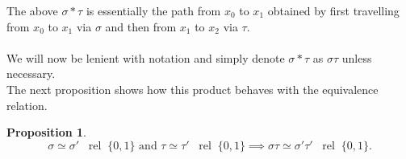 \documentclass[12pt]{article}
\theoremstyle{definition}
\numberwithin{thm}{section}
\newtheorem{prop}[thm]{Proposition}
\newcommand{\rel}{\;\;\operatorname{rel}\;}
\begin{document}
The above $\sigma*\tau$ is essentially the path from $x_0$ to $x_1$ obtained by first travelling from $x_0$ to $x_1$ via $\sigma$ and then from $x_1$ to $x_2$ via $\tau.$\\~\\
We will now be lenient with notation and simply denote $\sigma*\tau$ as $\sigma\tau$ unless necessary.\\
The next proposition shows how this product behaves with the equivalence relation.

\begin{prop}
	\begin{equation*} 
		\sigma \simeq \sigma' \rel \{0, 1\} \text{ and } \tau \simeq \tau' \rel \{0, 1\} \implies \sigma\tau \simeq \sigma'\tau' \rel \{0, 1\}.
	\end{equation*}
\end{prop}
\end{document}
